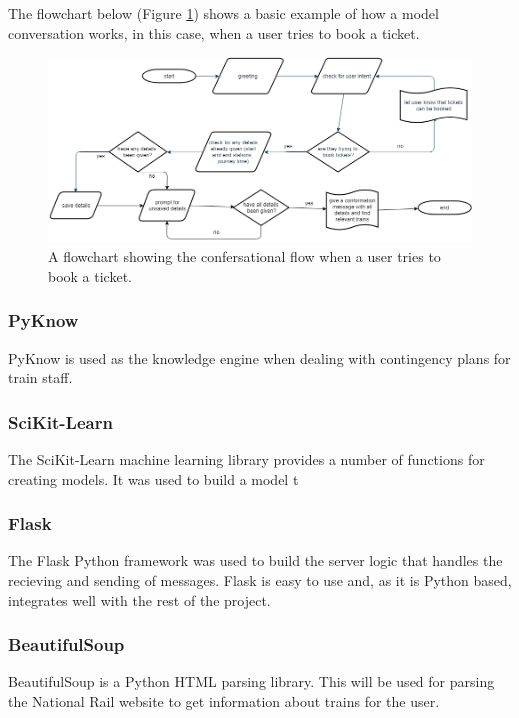 \documentclass[12pt,a4paper]{article}
\begin{document}
    The flowchart below (Figure \ref{fig:overall_flowchart}) shows a basic example of how a model conversation works, in this case, when a user tries to book a ticket.
    
    \begin{figure}[H]
        \centering
        \includegraphics[scale=0.4]{Images/flowchart_overall.png}
        \caption{A flowchart showing the confersational flow when a user tries to book a ticket.}
        \label{fig:overall_flowchart}
    \end{figure}
    
    \subsubsection{PyKnow}
    PyKnow is used as the knowledge engine when dealing with contingency plans for train staff. 
    
    \subsubsection{SciKit-Learn}
    The SciKit-Learn machine learning library provides a number of functions for creating models. It was used to build a model t
    
    \subsubsection{Flask}
    The Flask Python framework was used to build the server logic that handles the recieving and sending of messages. Flask is easy to use and, as it is Python based, integrates well with the rest of the project.
    
    \subsubsection{BeautifulSoup}
    \label{subsubsection:BeautifulSoup}
    BeautifulSoup is a Python HTML parsing library. This will be used for parsing the National Rail website to get information about trains for the user.
    
\end{document}
